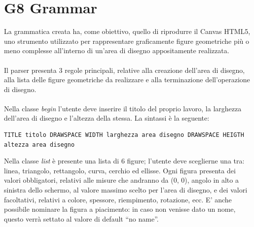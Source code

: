 \documentclass[a4paper]{article}
\begin{document}
\newpage

\section{G8 Grammar}
La grammatica creata ha, come obiettivo, quello di riprodurre il Canvas HTML5, uno strumento utilizzato per rappresentare graficamente figure geometriche più o meno complesse all’interno di un’area di disegno appositamente realizzata.
\\
\\
Il parser presenta 3 regole principali, relative alla creazione dell’area di disegno, alla lista delle figure geometriche da realizzare e alla terminazione dell’operazione di disegno.
\\
\\
Nella classe \textit{begin} l'utente deve inserire il titolo del proprio lavoro, la larghezza dell'area di disegno e l'altezza della stessa. La sintassi è la seguente:
\begin{verbatim}
TITLE titolo DRAWSPACE WIDTH larghezza area disegno DRAWSPACE HEIGTH altezza area disegno
\end{verbatim}
Nella classe \textit{list} è presente una lista di 6 figure; l'utente deve sceglierne una tra: linea, triangolo, rettangolo, curva, cerchio ed ellisse. Ogni figura presenta dei valori obbligatori, relativi alle misure che andranno da (0, 0), angolo in alto a sinistra dello schermo, al valore massimo scelto per l’area di disegno, e dei valori facoltativi, relativi a colore, spessore, riempimento, rotazione, ecc. E’ anche possibile nominare la figura a piacimento: in caso non venisse dato un nome, questo verrà settato al valore di default “no name”.
\end{document}
